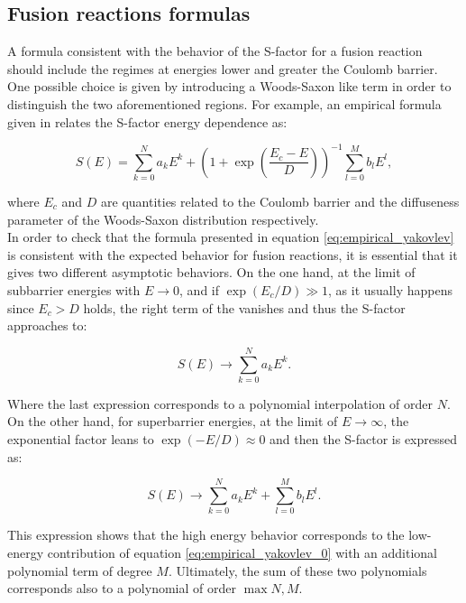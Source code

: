 \documentclass[openany]{book}
\begin{document}
\subsection{Fusion reactions formulas} \label{sub:empirical_fusion}

A formula consistent with the behavior of the S-factor for a  fusion reaction should include the regimes at energies lower and greater the Coulomb barrier. One possible choice is given by introducing a Woods-Saxon like term in order to distinguish the two aforementioned regions. For example, an empirical formula given in  \cite{beard_afanasjev_chamon_gasques_wiescher_yakovlev_2010} relates the S-factor energy dependence as:

\begin{equation} \label{eq:empirical_yakovlev}
	S(E) = \sum_{k=0}^{N} {a_kE^k} + \left(1 + \exp{\left( \frac{E_c - E}{D}\right)}\right)^{-1} \sum_{l=0}^{M} {b_lE^l},
\end{equation}

where $E_c$ and $D$ are quantities related to the Coulomb barrier and the diffuseness parameter of the Woods-Saxon distribution respectively. \\

In order to check that the formula presented in equation \ref{eq:empirical_yakovlev} is consistent with the expected behavior for fusion reactions, it is essential that it gives two different asymptotic behaviors. On the one hand, at the limit of subbarrier energies with $E \rightarrow 0 $, and if $\exp {(E_c/D)} \gg 1$, as it usually happens since $E_c > D$ holds, the right term of the  vanishes and thus the S-factor approaches to: 

\begin{equation} \label{eq:empirical_yakovlev_0}
	S(E) \rightarrow \sum_{k=0}^{N} {a_kE^k}. 
\end{equation}

Where the last expression corresponds to a polynomial interpolation of order $N$. On the other hand, for superbarrier energies, at the limit of $E \rightarrow \infty $, the exponential factor leans to $\exp {(-E/D)} \approx 0$ and then the S-factor is expressed as: 


\begin{equation} \label{eq:empirical_yakovlev_infty}
	S(E) \rightarrow \sum_{k=0}^{N} {a_kE^k} + \sum_{l=0}^{M} {b_lE^l}.
\end{equation}

This expression shows that the high energy behavior corresponds to the low-energy contribution of equation \ref{eq:empirical_yakovlev_0} with an additional polynomial term of degree $M$. Ultimately, the sum of these two polynomials corresponds also to a polynomial of order $\max{N, M}$. \\
\end{document}
